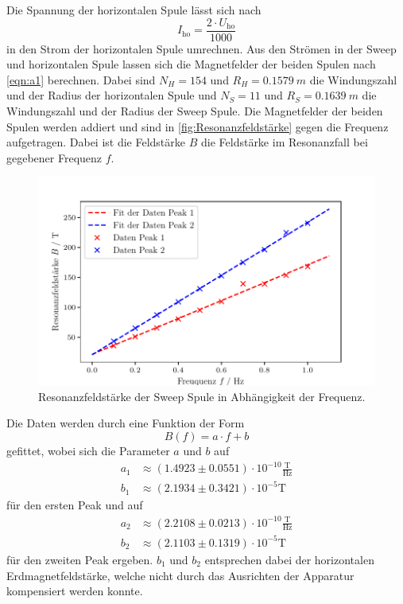 \newpage
\noindent
Die Spannung der horizontalen Spule lässt sich nach 
\begin{equation}
  I_{\text{ho}} = \frac{2 \cdot U_{\text{ho} }}{1000}
\end{equation}
in den Strom der horizontalen Spule umrechnen. Aus den Strömen in der Sweep und horizontalen Spule lassen sich die Magnetfelder der beiden Spulen nach \autoref{eqn:a1} berechnen.
Dabei sind $N_H = 154$ und $R_H = \SI{0.1579}{m}$ die Windungszahl und der Radius der horizontalen Spule und $N_S = 11$ und $R_S = \SI{0.1639}{m}$ die Windungszahl und der Radius der Sweep Spule.
Die Magnetfelder der beiden Spulen werden addiert und sind in \autoref{fig:Resonanzfeldstärke} gegen die Frequenz aufgetragen. Dabei ist die Feldstärke $B$ die Feldstärke im Resonanzfall bei gegebener Frequenz $f$.
\begin{figure}[H]
  \centering
  \includegraphics[width=0.8\linewidth]{build/plot1.pdf}
  \caption{Resonanzfeldstärke der Sweep Spule in Abhängigkeit der Frequenz.}
  \label{fig:Resonanzfeldstärke}
\end{figure}
\noindent
Die Daten werden durch eine Funktion der Form 
\begin{equation}
  B(f) = a \cdot f + b
\end{equation}
gefittet, wobei sich die Parameter $a$ und $b$ auf
\begin{align*}
  a_1 &\approx \left(1.4923 \pm  0.0551 \right) \cdot 10^{-10} \frac{\mathrm{T}}{\mathrm{Hz}}\\
  b_1 &\approx \left(2.1934 \pm 0.3421 \right) \cdot 10^{-5} \mathrm{T}
\end{align*}
für den ersten Peak und auf 
\begin{align*}
  a_2 &\approx \left(2.2108 \pm  0.0213 \right) \cdot 10^{-10} \frac{\mathrm{T}}{\mathrm{Hz}}\\
  b_2 &\approx \left(2.1103 \pm 0.1319 \right) \cdot 10^{-5} \mathrm{T}
\end{align*}
für den zweiten Peak ergeben. $b_1$ und $b_2$ entsprechen dabei der horizontalen Erdmagnetfeldstärke, welche nicht durch das Ausrichten der Apparatur kompensiert werden konnte.
